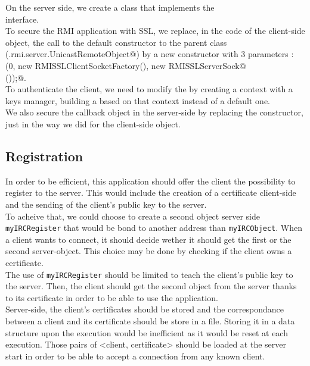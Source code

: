\documentclass{article}
\begin{document}
On the server side, we create a \verb@RMISSLServerSocketFactory@ class that implements the \verb@RMIServer@\\\verb@SocketFactory@ interface.\\

To secure the RMI application with SSL, we replace, in the code of the client-side object, the call to the default constructor to the parent class (\verb@java.rmi.server.UnicastRemoteObject@) by a new constructor with 3 parameters : \verb@super(0, new RMISSLClientSocketFactory(), new RMISSLServerSock@\\\verb@etFactory());@.\\

To authenticate the client, we need to modify the \verb@RMISSLClientFactory@ by creating a context with a keys manager, building a \verb@SocketFactory@ based on that context instead of a default one.\\

We also secure the callback object in the server-side by replacing the constructor, just in the way we did for the client-side object.
\subsection{Registration}
In order to be efficient, this application should offer the client the possibility to register to the server. This would include the creation of a certificate client-side and the sending of the client's public key to the server.\\
To acheive that, we could choose to create a second object server side \texttt{myIRCRegister} that would be bond to another address than \texttt{myIRCObject}. When a client wants to connect, it should decide wether it should get the first or the second server-object. This choice may be done by checking if the client owns a certificate.\\
The use of \texttt{myIRCRegister} should be limited to teach the client's public key to the server. Then, the client should get the second object from the server thanks to its certificate in order to be able to use the application.\\
Server-side, the client's certificates should be stored and the correspondance between a client and its certificate should be store in a file. Storing it in a data structure upon the execution would be inefficient as it would be reset at each execution. Those pairs of <client, certificate> should be loaded at the server start in order to be able to accept a connection from any known client.
\end{document}

